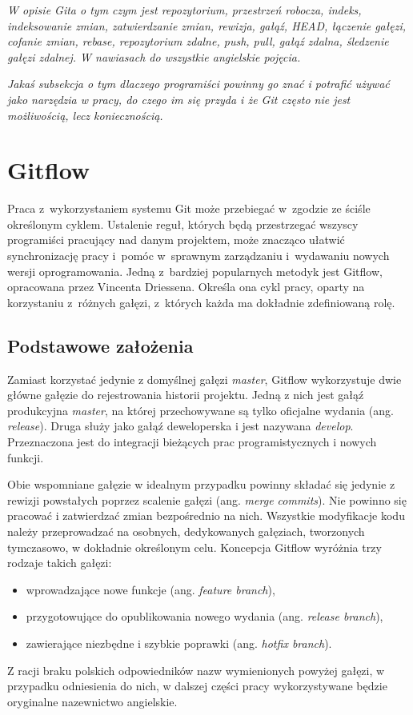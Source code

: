 \documentclass[11pt,a4paper,polish,thesis]{dcsbook}
\begin{document}
	\textit{W opisie Gita o tym czym jest repozytorium, przestrzeń robocza, indeks, indeksowanie zmian, zatwierdzanie zmian, rewizja, gałąź, HEAD, łączenie gałęzi, cofanie zmian, rebase, repozytorium zdalne, push, pull, gałąź zdalna, śledzenie gałęzi zdalnej. W nawiasach do wszystkie angielskie pojęcia.}
	
	\textit{Jakaś subsekcja o tym dlaczego programiści powinny go znać i potrafić używać jako narzędzia w pracy, do czego im się przyda i że Git często nie jest możliwością, lecz koniecznością.}
	
	\section{Gitflow}
	
	Praca z~wykorzystaniem systemu Git może przebiegać w~zgodzie ze ściśle określonym cyklem. Ustalenie reguł, których będą przestrzegać wszyscy programiści pracujący nad danym projektem, może znacząco ułatwić synchronizację pracy i~pomóc w~sprawnym zarządzaniu i~wydawaniu nowych wersji oprogramowania. Jedną z~bardziej popularnych metodyk jest Gitflow, opracowana przez Vincenta Driessena. Określa ona cykl pracy, oparty na korzystaniu z~różnych gałęzi, z~których każda ma dokładnie zdefiniowaną rolę.
	
	\subsection{Podstawowe założenia}
	
	Zamiast korzystać jedynie z domyślnej gałęzi \textit{master}, Gitflow wykorzystuje dwie główne gałęzie do rejestrowania historii projektu. Jedną z nich jest gałąź produkcyjna \textit{master}, na której przechowywane są tylko oficjalne wydania (ang. \textit{release}). Druga służy jako gałąź deweloperska i jest nazywana \textit{develop}. Przeznaczona jest do integracji bieżących prac programistycznych i nowych funkcji.
	
	Obie wspomniane gałęzie w idealnym przypadku powinny składać się jedynie z rewizji powstałych poprzez scalenie gałęzi (ang. \textit{merge commits}). Nie powinno się pracować i zatwierdzać zmian bezpośrednio na nich. Wszystkie modyfikacje kodu należy przeprowadzać na osobnych, dedykowanych gałęziach, tworzonych tymczasowo, w dokładnie określonym celu. Koncepcja Gitflow wyróżnia trzy rodzaje takich gałęzi:
	\begin{itemize}
		\item wprowadzające nowe funkcje (ang. \textit{feature branch}),
		\item przygotowujące do opublikowania nowego wydania (ang. \textit{release branch}),
		\item zawierające niezbędne i szybkie poprawki (ang. \textit{hotfix branch}).
	\end{itemize}
	Z racji braku polskich odpowiedników nazw wymienionych powyżej gałęzi, w przypadku odniesienia do nich, w dalszej części pracy wykorzystywane będzie oryginalne nazewnictwo angielskie.
	
\end{document}
